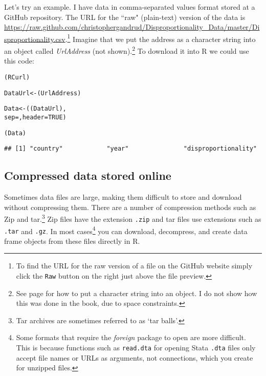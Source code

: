 Let's try an example. I have data in comma-separated values format stored at a GitHub repository. The URL for the ``raw" (plain-text) version of the data is \url{https://raw.github.com/christophergandrud/Disproportionality_Data/master/Disproportionality.csv}.\footnote{To find the URL for the raw version of a file on the GitHub website simply click the \texttt{Raw} button on the right just above the file preview.} Imagine that we put the address as a character string into an object called \emph{UrlAddress} (not shown).\footnote{See page \pageref{Objects} for how to put a character string into an object. I do not show how this was done in the book, due to space constraints.}
To download it into R we could use this code:




{\small
\begin{knitrout}
\color{fgcolor}\begin{kframe}
\begin{alltt}
(RCurl)

DataUrl <- (UrlAddress)

Data <- ((DataUrl), 
					sep = , header = TRUE)
					
(Data)
\end{alltt}
\begin{verbatim}
## [1] "country"            "year"               "disproportionality"
\end{verbatim}
\end{kframe}
\end{knitrout}

}

\subsection{Compressed data stored online}

Sometimes data files are large, making them difficult to store and download without compressing them. There are a number of compression methods such as Zip and tar.\footnote{Tar archives are sometimes referred to as `tar balls'.} Zip files have the extension {\tt{.zip}} and tar files use extensions such as {\tt{.tar}} and {\tt{.gz}}. In most cases\footnote{Some formats that require the {\emph{foreign}} package to open are more difficult. This is because functions such as {\tt{read.dta}} for opening Stata {\tt{.dta}} files only accept file names or URLs as arguments, not connections, which you create for unzipped files.} you can download, decompress, and create data frame objects from these files directly in R. 


